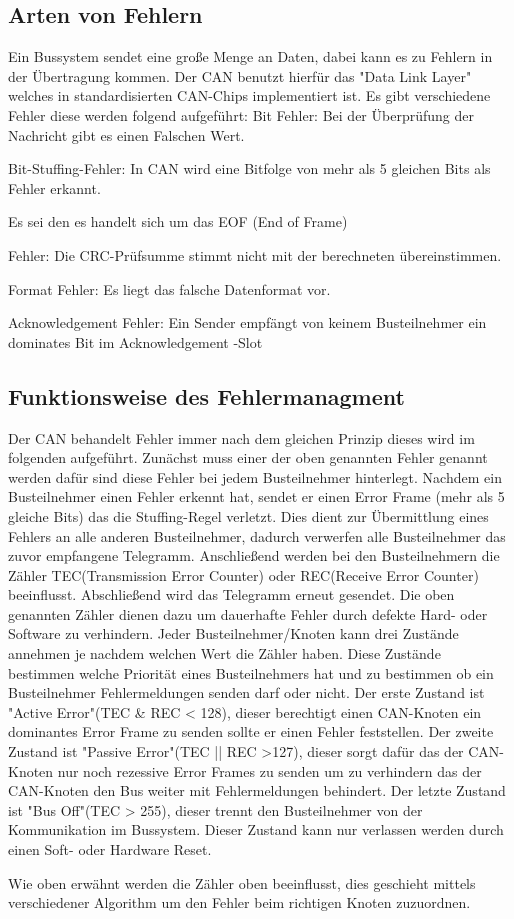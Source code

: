 
\subsection{Arten von Fehlern}
Ein Bussystem sendet eine große Menge an Daten, dabei kann es zu Fehlern in der Übertragung kommen.
Der CAN benutzt hierfür das "Data Link Layer" welches in standardisierten CAN-Chips implementiert ist.
Es gibt verschiedene Fehler diese werden folgend aufgeführt:
Bit Fehler: Bei der Überprüfung der Nachricht gibt es einen Falschen Wert.

Bit-Stuffing-Fehler: In CAN wird eine Bitfolge von mehr als 5 gleichen Bits als Fehler erkannt.

Es sei den es handelt sich um das EOF (End of Frame)

Fehler: Die CRC-Prüfsumme stimmt nicht mit der berechneten übereinstimmen.

Format Fehler: Es liegt das falsche Datenformat vor.

Acknowledgement Fehler: Ein Sender empfängt von keinem Busteilnehmer ein dominates Bit im Acknowledgement
-Slot
\subsection{Funktionsweise des Fehlermanagment}
Der CAN behandelt Fehler immer nach dem gleichen Prinzip dieses wird im folgenden aufgeführt.
Zunächst muss einer der oben genannten Fehler genannt werden dafür sind diese Fehler bei jedem Busteilnehmer
hinterlegt. Nachdem ein Busteilnehmer einen Fehler erkennt hat, sendet er einen Error Frame (mehr als
5 gleiche Bits) das die Stuffing-Regel verletzt. Dies dient zur Übermittlung eines Fehlers an alle anderen
Busteilnehmer, dadurch verwerfen alle Busteilnehmer das zuvor empfangene Telegramm. Anschließend
werden bei den Busteilnehmern die Zähler TEC(Transmission Error Counter) oder REC(Receive Error Counter)
beeinflusst. Abschließend wird das Telegramm erneut gesendet.
Die oben genannten Zähler dienen dazu um dauerhafte Fehler durch defekte Hard- oder Software zu 
verhindern.
Jeder Busteilnehmer/Knoten kann drei Zustände annehmen je nachdem welchen Wert die Zähler haben.
Diese Zustände bestimmen welche Priorität eines Busteilnehmers hat und zu bestimmen ob ein Busteilnehmer
Fehlermeldungen senden darf oder nicht.
Der erste Zustand ist "Active Error"(TEC \& REC < 128), dieser berechtigt einen CAN-Knoten ein dominantes
Error Frame zu senden sollte er einen Fehler feststellen.
Der zweite Zustand ist "Passive Error"(TEC || REC >127), dieser sorgt dafür das der CAN-Knoten nur noch
rezessive Error Frames zu senden um zu verhindern das der CAN-Knoten den Bus weiter mit Fehlermeldungen
behindert.
Der letzte Zustand ist "Bus Off"(TEC > 255), dieser trennt den Busteilnehmer von der Kommunikation im
Bussystem. Dieser Zustand kann nur verlassen werden durch einen Soft- oder Hardware Reset.

Wie oben erwähnt werden die Zähler oben beeinflusst, dies geschieht mittels verschiedener Algorithm
um den Fehler beim richtigen Knoten zuzuordnen.
